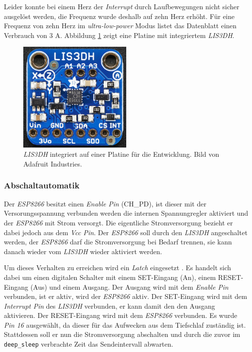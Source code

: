 Leider konnte bei einem Herz der \emph{Interrupt} durch Laufbewegungen nicht sicher ausgelöst werden, die Frequenz wurde deshalb auf zehn Herz erhöht.
Für eine Frequenz von zehn Herz im \emph{ultra-low-power} Modus listet das Datenblatt einen Verbrauch von 3 \textmu A.
Abbildung \ref{fig:lis3dh} zeigt eine Platine mit integriertem \emph{LIS3DH}.

\begin{figure}[h]
  \centering
	\includegraphics[width=0.5\textwidth]{images/lis3dhada.png}
  \caption{\emph{LIS3DH} integriert auf einer Platine für die Entwicklung. Bild von Adafruit Industries\protect \footnotemark.}
  \label{fig:lis3dh}
\end{figure}

\subsubsection{Abschaltautomatik}
\label{ch:Beschleunigungssensor:sec:Abschaltautomatik}
Der \emph{ESP8266} besitzt einen \emph{Enable Pin} (CH\_PD), ist dieser mit der Versorungsspannung verbunden werden die internen Spannungregler aktiviert und der \emph{ESP8266} mit Strom versorgt.
Die eigentliche Stromversorgung bezieht er dabei jedoch aus dem \emph{Vcc Pin}.
Der \emph{ESP8266} soll durch den \emph{LIS3DH} angeschaltet werden, der \emph{ESP8266} darf die Stromversorgung bei Bedarf trennen, sie kann danach wieder vom \emph{LIS3DH} wieder aktiviert werden. 

Um dieses Verhalten zu erreichen wird ein \emph{Latch} eingesetzt \cite{texas2003latch}.
Es handelt sich dabei um einen digitalen Schalter mit einem SET-Eingang (An), einem RESET-Eingang (Aus) und einem Ausgang.
Der Ausgang wird mit dem \emph{Enable Pin} verbunden, ist er aktiv, wird der \emph{ESP8266} aktiv.
Der SET-Eingang wird mit dem \emph{Interrupt Pin} des \emph{LIS3DH} verbunden, er kann damit den den Ausgang aktivieren.
Der RESET-Eingang wird mit dem \emph{ESP8266} verbunden. 
Es wurde \emph{Pin 16} ausgewählt, da dieser für das Aufwecken aus dem Tiefschlaf zuständig ist. 
Stattdessen soll er nun die Stromversorgung abschalten und durch die zuvor im \texttt{deep\_sleep} verbrachte Zeit das Sendeintervall abwarten.

